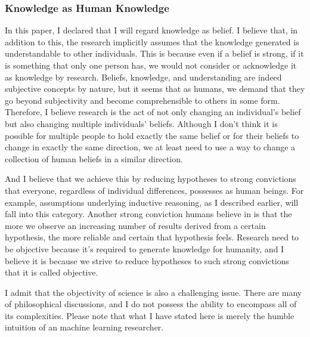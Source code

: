 \documentclass{book}
\begin{document}
\subsubsection{Knowledge as Human Knowledge}
In this paper, I declared that I will regard knowledge as belief. I believe that, in addition to this, the research implicitly assumes that the knowledge generated is understandable to other individuals. This is because even if a belief is strong, if it is something that only one person has, we would not consider or acknowledge it as knowledge by research. Beliefs, knowledge, and understanding are indeed subjective concepts by nature, but it seems that as humans, we demand that they go beyond subjectivity and become comprehensible to others in some form. Therefore, I believe research is the act of not only changing an individual's belief but also changing multiple individuals' beliefs. Although I don't think it is possible for multiple people to hold exactly the same belief or for their beliefs to change in exactly the same direction, we at least need to use a way to change a collection of human beliefs in a similar direction.

And I believe that we achieve this by reducing hypotheses to strong convictions that everyone, regardless of individual differences, possesses as human beings. For example, assumptions underlying inductive reasoning, as I described earlier, will fall into this category. Another strong conviction humans believe in is that the more we observe an increasing number of results derived from a certain hypothesis, the more reliable and certain that hypothesis feels. Research need to be objective because it's required to generate knowledge for humanity, and I believe it is because we strive to reduce hypotheses to such strong convictions that it is called objective. 

I admit that the objectivity of science is also a challenging issue. There are many of philosophical discussions, and I do not possess the ability to encompass all of its complexities. Please note that what I have stated here is merely the humble intuition of an machine learning researcher.
\end{document}

